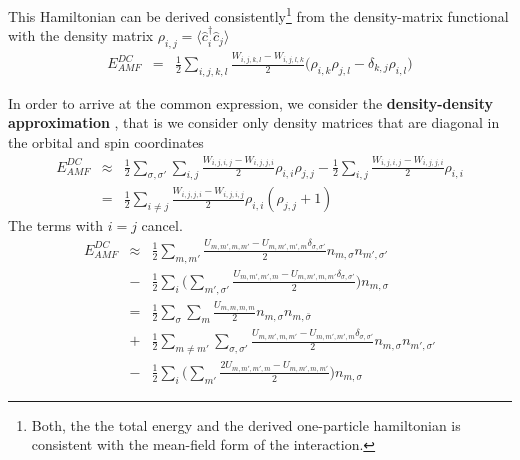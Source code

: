 \documentclass[11pt,a4paper]{report}
\begin{document}
This Hamiltonian can be derived consistently\footnote{Both, the the
  total energy and the derived one-particle hamiltonian is consistent
  with the mean-field form of the interaction.} from the
density-matrix functional with the density matrix
$\rho_{i,j}=\langle\hat{c}^\dagger_i\hat{c}_j\rangle$
\begin{eqnarray}
E^{DC}_{AMF}
&=&
\frac{1}{2}\sum_{i,j,k,l}\frac{W_{i,j,k,l}-W_{i,j,l,k}}{2} 
\biggl(\rho_{i,k}\rho_{j,l}-\delta_{k,j}\rho_{i,l}\biggr)
\end{eqnarray}

In order to arrive at the common expression, we consider the
\textbf{density-density approximation} , that is we consider only density matrices that are
diagonal in the orbital and spin coordinates
\begin{eqnarray}
E^{DC}_{AMF}
&\approx&
\frac{1}{2}\sum_{\sigma,\sigma'}\sum_{i,j}\frac{W_{i,j,i,j}-W_{i,j,j,i}}{2} 
\rho_{i,i}\rho_{j,j}
-
\frac{1}{2}\sum_{i,j}\frac{W_{i,j,i,j}-W_{i,j,j,i}}{2} 
\rho_{i,i}
\nonumber\\
&=&
\frac{1}{2}\sum_{i\neq j}\frac{W_{i,j,j,i}-W_{i,j,i,j}}{2} 
\rho_{i,i}(\rho_{j,j}+1)
\end{eqnarray}
The terms with $i=j$ cancel.
\begin{eqnarray}
E^{DC}_{AMF}
&\approx&
\frac{1}{2}\sum_{m,m'}\frac{U_{m,m',m,m'}-U_{m,m',m',m}\delta_{\sigma,\sigma'}}{2} 
n_{m,\sigma}n_{m',\sigma'}
\nonumber\\
&-&
\frac{1}{2}\sum_{i}
\biggl(\sum_{m',\sigma'}\frac{U_{m,m',m',m}-U_{m,m',m,m'}
\delta_{\sigma,\sigma'}}{2}\biggr)
n_{m,\sigma}
\nonumber\\
&=&
\frac{1}{2}\sum_\sigma\sum_{m}\frac{U_{m,m,m,m}}{2}n_{m,\sigma}n_{m,\bar{\sigma}}
\nonumber\\
&+&\frac{1}{2}\sum_{m\neq m'}\sum_{\sigma,\sigma'}
\frac{U_{m,m',m,m'}-U_{m,m',m',m}\delta_{\sigma,\sigma'}}{2} 
n_{m,\sigma}n_{m',\sigma'}
\nonumber\\
&-&
\frac{1}{2}\sum_{i}
\biggl(\sum_{m'}
\frac{2U_{m,m',m',m}-U_{m,m',m,m'}}{2}\biggr)n_{m,\sigma}
\end{eqnarray}


\end{document}
